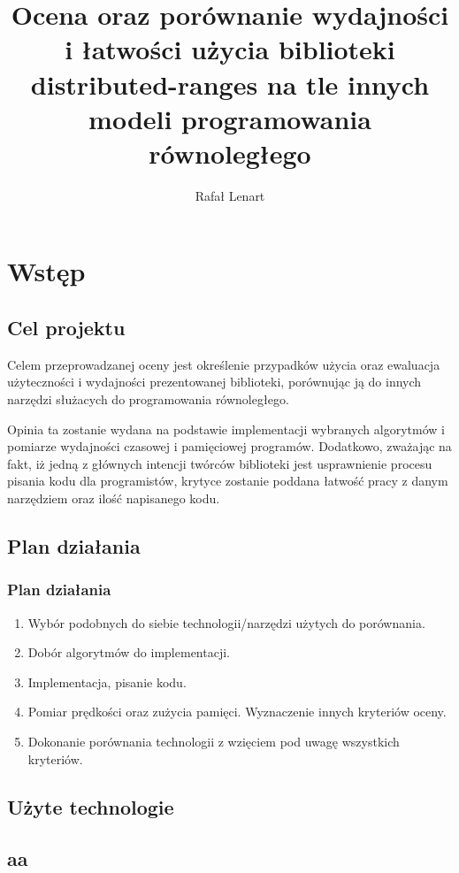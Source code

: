\documentclass[11pt]{beamer}
\title{Ocena oraz porównanie wydajności i łatwości użycia biblioteki distributed-ranges na tle innych modeli programowania równoległego}
\author{Rafał Lenart}
\begin{document}
\maketitle
\begin{frame}
	\tableofcontents
\end{frame}

\section{Wstęp}
\subsection{Cel projektu}
\begin{frame}{\subsecname}
	Celem przeprowadzanej oceny jest określenie przypadków użycia oraz ewaluacja użyteczności  i wydajności prezentowanej biblioteki, porównując ją do innych narzędzi służacych do programowania równoległego.

	Opinia ta zostanie wydana na podstawie implementacji wybranych algorytmów i pomiarze 
	wydajności czasowej i pamięciowej programów. 
	Dodatkowo,	zważając na fakt, iż jedną z głównych intencji twórców biblioteki jest 
	usprawnienie procesu pisania kodu dla programistów, krytyce zostanie poddana łatwość 
	pracy z danym narzędziem oraz ilość napisanego kodu.
\end{frame}

\begin{frame}
	\subsection{Plan działania}
	\frametitle{Plan działania}
	
	\begin{enumerate}
		\item Wybór podobnych do siebie technologii/narzędzi użytych do porównania.
		\item Dobór algorytmów do implementacji.
		\item Implementacja, pisanie kodu.
		\item Pomiar prędkości oraz zużycia pamięci. Wyznaczenie innych kryteriów oceny.
		\item Dokonanie porównania technologii z wzięciem pod uwagę wszystkich kryteriów. 
	\end{enumerate}	
		
\end{frame}

\begin{frame}
	\section{Użyte technologie}
	\begin{center}
	\insertsectionhead\par%
	\end{center}
\end{frame}

\begin{frame}
	\subsection{aa}
\end{frame}
\end{document}
